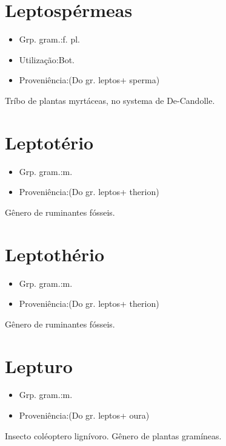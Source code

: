 \section{Leptospérmeas}
\begin{itemize}
\item {Grp. gram.:f. pl.}
\end{itemize}
\begin{itemize}
\item {Utilização:Bot.}
\end{itemize}
\begin{itemize}
\item {Proveniência:(Do gr. \textunderscore leptos\textunderscore  + \textunderscore sperma\textunderscore )}
\end{itemize}
Tríbo de plantas myrtáceas, no systema de De-Candolle.
\section{Leptotério}
\begin{itemize}
\item {Grp. gram.:m.}
\end{itemize}
\begin{itemize}
\item {Proveniência:(Do gr. \textunderscore leptos\textunderscore  + \textunderscore therion\textunderscore )}
\end{itemize}
Gênero de ruminantes fósseis.
\section{Leptothério}
\begin{itemize}
\item {Grp. gram.:m.}
\end{itemize}
\begin{itemize}
\item {Proveniência:(Do gr. \textunderscore leptos\textunderscore  + \textunderscore therion\textunderscore )}
\end{itemize}
Gênero de ruminantes fósseis.
\section{Lepturo}
\begin{itemize}
\item {Grp. gram.:m.}
\end{itemize}
\begin{itemize}
\item {Proveniência:(Do gr. \textunderscore leptos\textunderscore  + \textunderscore oura\textunderscore )}
\end{itemize}
Insecto coléoptero lignívoro.
Gênero de plantas gramíneas.
